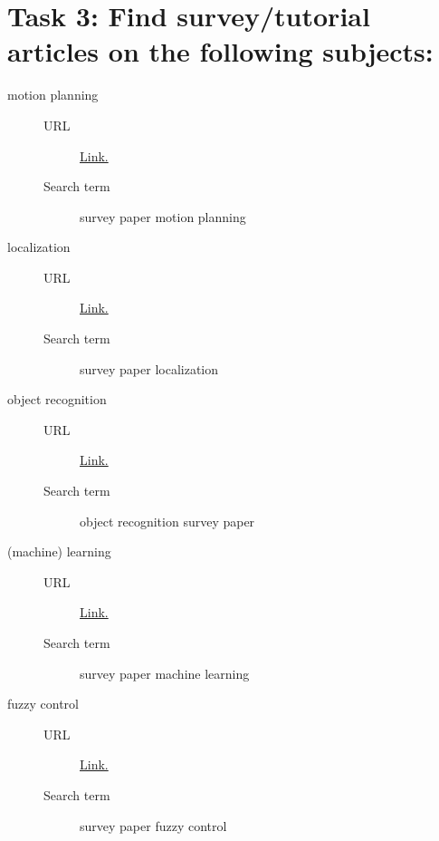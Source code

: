 \documentclass{article}
\begin{document}
\section*{Task 3: Find survey/tutorial articles on the following subjects:}
\begin{description}
    \item[motion planning] \hfill
    \begin{description}
        \item[URL] \href{https://arxiv.org/pdf/1604.07446.pdf}{Link.}
        \item[Search term] survey paper motion planning
    \end{description}  
    \item[localization] \hfill
    \begin{description}
        \item[URL] \href{https://arxiv.org/pdf/1709.01015.pdf}{Link.}
        \item[Search term] survey paper localization
    \end{description}  
    \item[object recognition] \hfill
    \begin{description}
        \item[URL] \href{https://arxiv.org/abs/1808.07256}{Link.}
        \item[Search term] object recognition survey paper
    \end{description}  
    \item[(machine) learning] \hfill
    \begin{description}
        \item[URL] \href{http://citeseerx.ist.psu.edu/viewdoc/summary;jsessionid=71DAED5346D8ABE18E56B95F18C36325?doi=10.1.1.103.1693&rank=5}{Link.}
        \item[Search term] survey paper machine learning 
    \end{description}  
    \item[fuzzy control] \hfill
    \begin{description}
        \item[URL] \href{https://ieeexplore.ieee.org/document/1707754}{Link.}
        \item[Search term] survey paper fuzzy control
    \end{description} 
\end{description}















%  
% 
\end{document}
